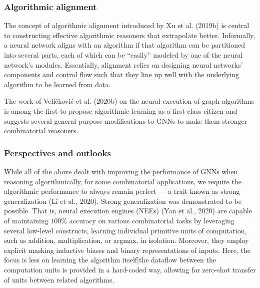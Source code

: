 \documentclass[10pt]{book}
\begin{document}
\subsubsection{Algorithmic alignment}

The concept of algorithmic alignment introduced by Xu et al. (2019b) is central to constructing effective algorithmic reasoners that extrapolate better. Informally, a neural network aligns with an algorithm if that algorithm can be partitioned into several parts, each of which can be ``easily'' modeled by one of the neural network's modules. Essentially, alignment relies on designing neural networks' components and control flow such that they line up well with the underlying algorithm to be learned from data.

The work of Veli{\v c}kovi{\' c} et al. (2020b) on the neural execution of graph algorithms is among the first to propose algorithmic learning as a first-class citizen and suggests several general-purpose modifications to GNNs to make them stronger combinatorial reasoners.

\subsubsection{Perspectives and outlooks}

While all of the above dealt with improving the performance of GNNs when reasoning algorithmically, for some combinatorial applications, we require the algorithmic performance to always remain perfect --- a trait known as strong generalization (Li et al., 2020). Strong generalization was demonstrated to be possible. That is, neural execution engines (NEEs) (Yan et al., 2020) are capable of maintaining $100\%$ accuracy on various combinatorial tasks by leveraging several low-level constructs, learning individual primitive units of computation, such as addition, multiplication, or argmax, in isolation. Moreover, they employ explicit masking inductive biases and binary representations of inputs. Here, the focus is less on learning the algorithm itself|the dataflow between the computation units is provided in a hard-coded way, allowing for zero-shot transfer of units between related algorithms.









\printindex

\nocite{*}

\end{document}
